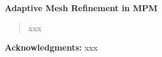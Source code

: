 \documentclass[12pt,a4paper,amstype]{article}
\begin{document}
\begin{center}
{\large {\bf Adaptive Mesh Refinement in MPM}}
\end{center}

\vspace{.01in}

\centerline{
}

\date{xxx}

\begin{abstract}
xxx
\end{abstract}



%
%

%
%
%
%

\vspace{0.2in}
{\bf Acknowledgments:}
xxx

%
\end{document}
